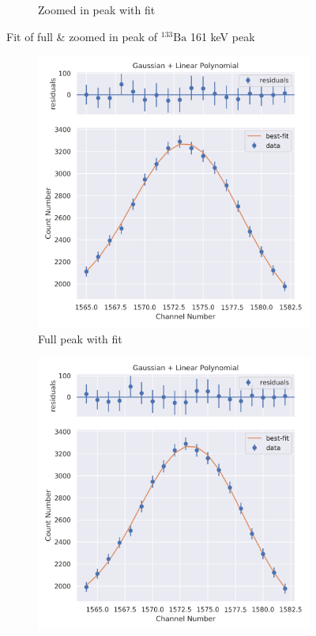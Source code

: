 \documentclass[11pt,a4paper]{article}
\newcommand{\element}[2]{$^{#2}\textrm{#1}$}
\begin{document}
\begin{figure}[H]
\begin{subfigure}{.5\linewidth}
    \caption{Zoomed in peak with fit}
  \end{subfigure}
  \caption{Fit of full \& zoomed in peak of \element{Ba}{133} 161 keV peak}
\end{figure}
\begin{figure}[H]
  \centering
  \begin{subfigure}{.5\linewidth}
    \centering
    \includegraphics[width=\linewidth]{./Images/Barium133/Linear/Linear_3_Full.png}
    \caption{Full peak with fit}
  \end{subfigure}%
  \begin{subfigure}{.5\linewidth}
    \centering
    \includegraphics[width=\linewidth]{./Images/Barium133/Linear/Linear_3_Zoom.png}

\end{subfigure}
\end{figure}
\end{document}
